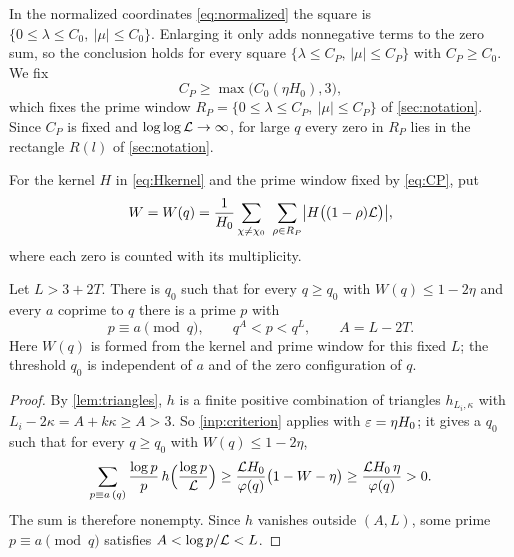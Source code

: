 In the normalized coordinates \eqref{eq:normalized} the square is
$\{0\le\lambda\le C_0,\ |\mu|\le C_0\}$. Enlarging it only adds nonnegative terms to the zero
sum, so the conclusion holds for every square $\{\lambda\le C_P,\,|\mu|\le C_P\}$ with $C_P\ge
C_0$. We fix
\begin{equation}\label{eq:CP}
  C_P\ge\max\bigl(C_0(\eta H_0),3\bigr),
\end{equation}
which fixes the prime window $R_P=\{0\le\lambda\le C_P,\ |\mu|\le C_P\}$ of \cref{sec:notation}. Since $C_P$ is fixed and
$\log\log\mathcal{L}\to\infty$, for large $q$ every zero in $R_P$ lies in the rectangle $R(l)$ of
\cref{sec:notation}.

\begin{definition}\label{def:zerosum}
For the kernel $H$ in \eqref{eq:Hkernel} and the prime window fixed by \eqref{eq:CP}, put
\[
  W=W(q)=\frac1{H_0}\sum_{\chi\ne\chi_0}\ \sum_{\rho\in R_P}\bigl|H\bigl((1-\rho)\LL\bigr)\bigr| ,
\]
where each zero is counted with its multiplicity.
\end{definition}

\begin{proposition}\label{prop:detect}
Let $L>3+2T$. There is $q_0$ such that for every $q\ge q_0$ with $W(q)\le1-2\eta$ and every $a$ coprime
to $q$ there is a prime $p$ with
\[
  p\equiv a\pmod q,\qquad q^{A}<p<q^{L},\qquad A=L-2T.
\]
Here $W(q)$ is formed from the kernel and prime window for this fixed $L$; the threshold
$q_0$ is independent of $a$ and of the zero configuration of $q$.
\end{proposition}

\begin{proof}
By \cref{lem:triangles}, $h$ is a finite positive combination of triangles $h_{L_i,\kappa}$ with
$L_i-2\kappa=A+k\kappa\ge A>3$. So \cref{inp:criterion} applies with $\varepsilon=\eta H_0$; it
gives a $q_0$ such that for every $q\ge q_0$ with $W(q)\le1-2\eta$,
\[
  \sum_{p\equiv a\,(q)}\frac{\log p}{p}\,h\Bigl(\frac{\log p}{\mathcal{L}}\Bigr)\ge
  \frac{\mathcal{L} H_0}{\varphi(q)}\bigl(1-W-\eta\bigr)\ge\frac{\mathcal{L} H_0\,\eta}{\varphi(q)}>0 .
\]
The sum is therefore nonempty. Since $h$ vanishes outside $(A,L)$, some prime $p\equiv a\pmod q$
satisfies $A<\log p/\mathcal{L}<L$.
\end{proof}

